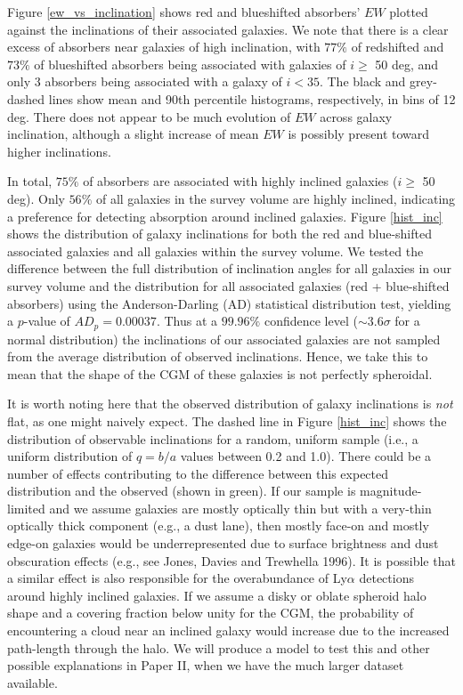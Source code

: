 Figure \ref{ew_vs_inclination} shows red and blueshifted absorbers' $EW$ plotted against the inclinations of their associated galaxies. We note that there is a clear excess of absorbers near galaxies of high inclination, with $77\%$ of redshifted and $73\%$ of blueshifted absorbers being associated with galaxies of $i \geq$ 50 deg, and only 3 absorbers being associated with a galaxy of $i<35$. The black and grey-dashed lines show mean and 90th percentile histograms, respectively, in bins of 12 deg. There does not appear to be much evolution of $EW$ across galaxy inclination, although a slight increase of mean $EW$ is possibly present toward higher inclinations.

In total, $75\%$ of absorbers are associated with highly inclined galaxies ($i \geq$ 50 deg). Only $56\%$ of all galaxies in the survey volume are highly inclined, indicating a preference for detecting absorption around inclined galaxies. Figure \ref{hist_inc} shows the distribution of galaxy inclinations for both the red and blue-shifted associated galaxies and all galaxies within the survey volume. We tested the difference between the full distribution of inclination angles for all galaxies in our survey volume and the distribution for all associated galaxies (red + blue-shifted absorbers) using the Anderson-Darling (AD) statistical distribution test, yielding a $p$-value of $AD_{p} = 0.00037$. Thus at a $99.96\%$ confidence level ($\sim 3.6 \sigma$ for a normal distribution) the inclinations of our associated galaxies are not sampled from the average distribution of observed inclinations. Hence, we take this to mean that the shape of the CGM of these galaxies is not perfectly spheroidal. 

It is worth noting here that the observed distribution of galaxy inclinations is \emph{not} flat, as one might naively expect. The dashed line in Figure \ref{hist_inc} shows the distribution of observable inclinations for a random, uniform sample (i.e., a uniform distribution of $q=b/a$ values between 0.2 and 1.0). There could be a number of effects contributing to the difference between this expected distribution and the observed (shown in green). If our sample is magnitude-limited and we assume galaxies are mostly optically thin but with a very-thin optically thick component (e.g., a dust lane), then mostly face-on and mostly edge-on galaxies would be underrepresented due to surface brightness and dust obscuration effects (e.g., see Jones, Davies and Trewhella 1996). It is possible that a similar effect is also responsible for the overabundance of Ly$\alpha$ detections around highly inclined galaxies. If we assume a disky or oblate spheroid halo shape and a covering fraction below unity for the CGM, the probability of encountering a cloud near an inclined galaxy would increase due to the increased path-length through the halo. We will produce a model to test this and other possible explanations in Paper II, when we have the much larger dataset available.

